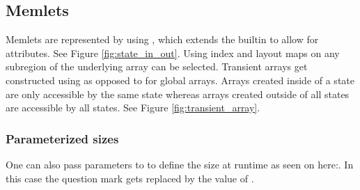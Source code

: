 \subsection{Memlets} \label{section:memlet}
Memlets are represented by using , which extends the builtin  to allow for attributes. See Figure \ref{fig:state_in_out}. Using index and layout maps on  any subregion of the underlying array can be selected. Transient arrays get constructed using  as opposed to  for global arrays. Arrays created inside of a state are only accessible by the same state whereas arrays created outside of all states are accessible by all states. See Figure \ref{fig:transient_array}.
\\

\subsubsection{Parameterized sizes}
 One can also pass parameters to  to define the size at runtime as seen on here:. In this case the question mark  gets replaced by the value of .
 
